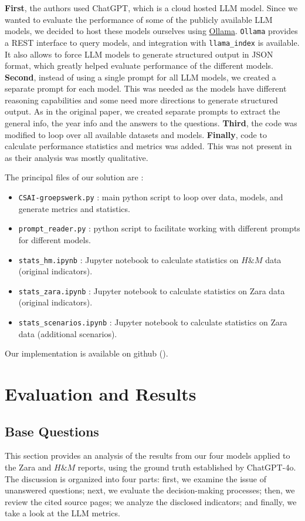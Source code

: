 \documentclass[]{article}
\begin{document}
\textbf{First}, the authors used ChatGPT, which is a cloud hosted LLM model.
Since we wanted to evaluate the performance of some of the publicly available LLM models, we decided to host these models ourselves using \href{https://ollama.com/}{Ollama}.
\texttt{Ollama} provides a REST interface to query models, and integration with \texttt{llama\_index} is available.
It also allows to force LLM models to generate structured output in JSON format, which greatly helped evaluate performance of the different models.
\textbf{Second}, instead of using a single prompt for all LLM models, we created a separate prompt for each model.
This was needed as the models have different reasoning capabilities and some need more directions to generate structured output.
As in the original paper, we created separate prompts to extract the general info, the year info and the answers to the questions.
\textbf{Third}, the code was modified to loop over all available datasets and models.
\textbf{Finally}, code to calculate performance statistics and metrics was added.
This was not present in \cite{durability} as their analysis was mostly qualitative.

The principal files of our solution are :

\begin{itemize}
    \item \texttt{CSAI-groepswerk.py} : main python script to loop over data, models, and generate metrics and statistics.
    \item \texttt{prompt\_reader.py} : python script to facilitate working with different prompts for different models.
    \item \texttt{stats\_hm.ipynb} : Jupyter notebook to calculate statistics on $H\&M$ data (original indicators).
    \item \texttt{stats\_zara.ipynb} : Jupyter notebook to calculate statistics on Zara data (original indicators).
    \item \texttt{stats\_scenarios.ipynb} : Jupyter notebook to calculate statistics on Zara data (additional scenarios).
\end{itemize}

Our implementation is available on github (\cite{github}).

\section{Evaluation and Results} \label{sec:evaluation}
\subsection{Base Questions}
This section provides an analysis of the results from our four models applied to the Zara and $H\&M$ reports, using the ground truth established by ChatGPT-4o.
The discussion is organized into four parts: first, we examine the issue of unanswered questions; 
next, we evaluate the decision-making processes; then, we review the cited source pages; 
we analyze the disclosed indicators; and finally, we take a look at the LLM metrics.
\end{document}
